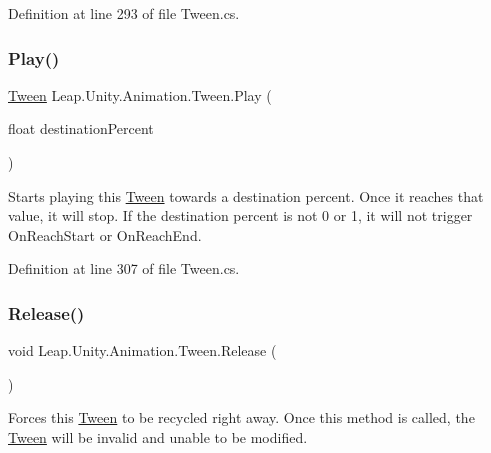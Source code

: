 Definition at line 293 of file Tween.\+cs.

\mbox{\label{struct_leap_1_1_unity_1_1_animation_1_1_tween_a8453ef9311e720d1518b1a6bd9466ff9}} 
\subsubsection{\texorpdfstring{Play()}{Play()}\hspace{0.1cm}{\footnotesize\ttfamily [3/3]}}
{\footnotesize\ttfamily \mbox{\hyperlink{struct_leap_1_1_unity_1_1_animation_1_1_tween}{Tween}} Leap.\+Unity.\+Animation.\+Tween.\+Play (\begin{DoxyParamCaption}\item[{float}]{destination\+Percent }\end{DoxyParamCaption})}



Starts playing this \mbox{\hyperlink{struct_leap_1_1_unity_1_1_animation_1_1_tween}{Tween}} towards a destination percent. Once it reaches that value, it will stop. If the destination percent is not 0 or 1, it will not trigger On\+Reach\+Start or On\+Reach\+End. 



Definition at line 307 of file Tween.\+cs.

\mbox{\label{struct_leap_1_1_unity_1_1_animation_1_1_tween_aae3c96c326e36d7dd2079ec15f772409}} 
\subsubsection{\texorpdfstring{Release()}{Release()}}
{\footnotesize\ttfamily void Leap.\+Unity.\+Animation.\+Tween.\+Release (\begin{DoxyParamCaption}{ }\end{DoxyParamCaption})}



Forces this \mbox{\hyperlink{struct_leap_1_1_unity_1_1_animation_1_1_tween}{Tween}} to be recycled right away. Once this method is called, the \mbox{\hyperlink{struct_leap_1_1_unity_1_1_animation_1_1_tween}{Tween}} will be invalid and unable to be modified. 



